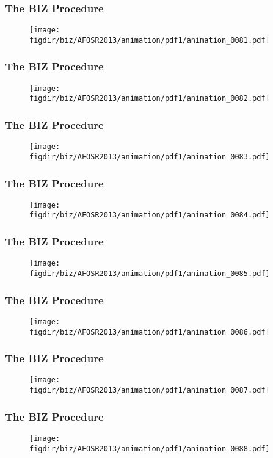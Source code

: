\documentclass[13pt]{beamer}
\newcommand{\figdir}{../../fig}
\begin{document}
\begin{frame}\frametitle{The BIZ Procedure}\begin{figure}\texttt{[image: \\figdir/biz/AFOSR2013/animation/pdf1/animation\_0081.pdf]}\end{figure}\end{frame}
\begin{frame}\frametitle{The BIZ Procedure}\begin{figure}\texttt{[image: \\figdir/biz/AFOSR2013/animation/pdf1/animation\_0082.pdf]}\end{figure}\end{frame}
\begin{frame}\frametitle{The BIZ Procedure}\begin{figure}\texttt{[image: \\figdir/biz/AFOSR2013/animation/pdf1/animation\_0083.pdf]}\end{figure}\end{frame}
\begin{frame}\frametitle{The BIZ Procedure}\begin{figure}\texttt{[image: \\figdir/biz/AFOSR2013/animation/pdf1/animation\_0084.pdf]}\end{figure}\end{frame}
\begin{frame}\frametitle{The BIZ Procedure}\begin{figure}\texttt{[image: \\figdir/biz/AFOSR2013/animation/pdf1/animation\_0085.pdf]}\end{figure}\end{frame}
\begin{frame}\frametitle{The BIZ Procedure}\begin{figure}\texttt{[image: \\figdir/biz/AFOSR2013/animation/pdf1/animation\_0086.pdf]}\end{figure}\end{frame}
\begin{frame}\frametitle{The BIZ Procedure}\begin{figure}\texttt{[image: \\figdir/biz/AFOSR2013/animation/pdf1/animation\_0087.pdf]}\end{figure}\end{frame}
\begin{frame}\frametitle{The BIZ Procedure}\begin{figure}\texttt{[image: \\figdir/biz/AFOSR2013/animation/pdf1/animation\_0088.pdf]}\end{figure}\end{frame}
\end{document}

